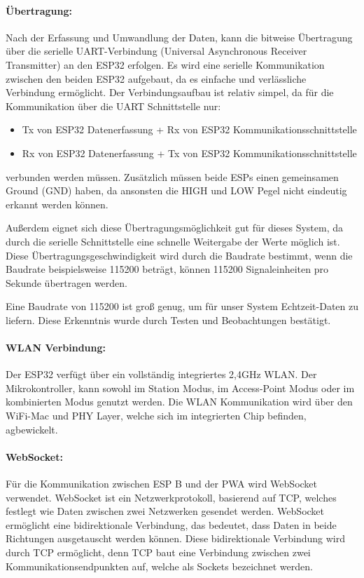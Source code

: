 \paragraph{Übertragung:}
Nach der Erfassung und Umwandlung der Daten, kann die bitweise Übertragung über die serielle UART-Verbindung (Universal Asynchronous Receiver Transmitter) an den ESP32 erfolgen. 
Es wird eine serielle Kommunikation zwischen den beiden ESP32 aufgebaut, da es einfache und verlässliche Verbindung ermöglicht. 
Der Verbindungsaufbau ist relativ simpel, da für die Kommunikation über die UART Schnittstelle nur:
\begin{itemize}
    \item Tx von ESP32 Datenerfassung + Rx von ESP32 Kommunikationsschnittstelle
    \item Rx von ESP32 Datenerfassung + Tx von ESP32 Kommunikationsschnittstelle
\end{itemize}
verbunden werden müssen. Zusätzlich müssen beide ESPs einen gemeinsamen Ground (GND) haben, 
da ansonsten die HIGH und LOW Pegel nicht eindeutig erkannt werden können. \cite{wollesElektronikkiste_RxTx}

\par\vspace{1em}

\noindent
Außerdem eignet sich diese Übertragungsmöglichkeit gut für dieses System, da durch die serielle Schnittstelle eine schnelle Weitergabe der Werte möglich ist. Diese Übertragungsgeschwindigkeit wird durch die Baudrate bestimmt, wenn die Baudrate beispielsweise 115200 beträgt, 
können 115200 Signaleinheiten pro Sekunde übertragen werden. \cite{riverdi_baudrate} 

\noindent
Eine Baudrate von 115200 ist groß genug, um für unser System Echtzeit-Daten zu liefern. Diese Erkenntnis wurde durch Testen und Beobachtungen bestätigt.

\paragraph{WLAN Verbindung:}
Der ESP32 verfügt über ein vollständig integriertes 2,4GHz WLAN. Der Mikrokontroller, kann sowohl im Station Modus, 
im Access-Point Modus oder im kombinierten Modus genutzt werden. 
Die WLAN Kommunikation wird über den WiFi-Mac und PHY Layer, welche sich im integrierten Chip befinden, agbewickelt. \cite{espressif_esp32_wifi}

\paragraph{WebSocket:}
Für die Kommunikation zwischen ESP B und der PWA wird WebSocket verwendet. WebSocket ist ein Netzwerkprotokoll, basierend auf TCP, welches festlegt wie Daten zwischen zwei Netzwerken gesendet werden. WebSocket ermöglicht eine bidirektionale Verbindung, das bedeutet, dass Daten in beide Richtungen ausgetauscht werden können. Diese bidirektionale Verbindung wird durch TCP ermöglicht, denn TCP baut eine Verbindung zwischen zwei Kommunikationsendpunkten auf, welche als Sockets bezeichnet werden.

